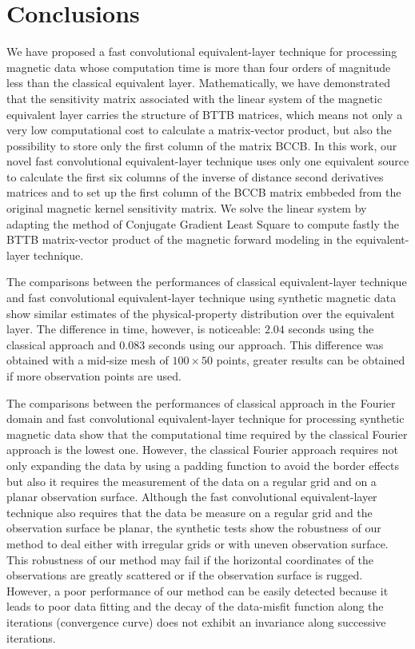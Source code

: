 \section{Conclusions}

We have proposed  a fast convolutional equivalent-layer technique for processing magnetic data 
whose computation time is more than four orders of magnitude less than the classical equivalent layer.
Mathematically, we have  demonstrated that the sensitivity matrix associated with the linear system of the magnetic equivalent layer carries the structure of BTTB matrices, which means not only a very low computational cost to calculate a matrix-vector product, but also the possibility to store only the first column of the matrix BCCB. 
In this work, our novel fast convolutional equivalent-layer technique  uses only one equivalent source to calculate the first six columns of the inverse of distance second derivatives matrices and to set up the first column of the BCCB matrix embbeded from the original magnetic kernel sensitivity matrix.
We solve the linear system by adapting the method of Conjugate Gradient Least Square to compute fastly the BTTB matrix-vector product of the magnetic forward modeling in the equivalent-layer technique.

The comparisons between the performances of classical equivalent-layer technique  and  fast convolutional equivalent-layer technique using synthetic magnetic data show similar estimates of the physical-property distribution over the equivalent layer.
The difference in time, however, is noticeable: $2.04$ seconds using the classical approach and $0.083$ seconds using our approach. This difference was obtained with a mid-size mesh of $100 \times 50$ points, greater results can be obtained if more observation points are used.

The comparisons between the performances of classical approach in the Fourier domain and fast convolutional equivalent-layer technique for processing synthetic magnetic data show that the computational time required by the classical Fourier approach is the lowest one.
However, the classical Fourier approach requires not only expanding the data by using a padding function to avoid the border effects but also it requires the measurement of the data on a regular grid and on a planar observation surface.
Although the fast convolutional equivalent-layer technique  also requires that the data be measure on a regular grid and the observation surface be planar, the synthetic tests show the robustness of our method to deal  either with irregular grids or with uneven observation surface.
This robustness of our method may fail if the horizontal coordinates of the observations are greatly scattered
or if the observation surface is rugged.
However, a poor performance of our method  can be easily detected  because it leads to poor data fitting and the decay of the data-misfit function along the iterations (convergence curve) does not exhibit an invariance along successive iterations. 

